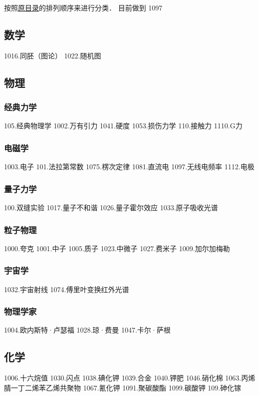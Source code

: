 
\begin{issues}
\issueDraft
\end{issues}

按照\href{https://wuli.wiki/assets/sogou}{原目录}的排列顺序来进行分类． 目前做到 1097

\subsection{数学}

1016.同胚（图论）
1022.随机图

\subsection{物理}
\subsubsection{经典力学}
105.经典物理学
1002.万有引力
1041.硬度
1053.损伤力学
110.接触力
1110.G力
\subsubsection{电磁学}
1003.电子
101.法拉第常数
1075.楞次定律
1081.直流电
1097.无线电频率
1112.电极
\subsubsection{量子力学}
100.双缝实验
1017.量子不和谐
1026.量子霍尔效应
1033.原子吸收光谱
\subsubsection{粒子物理}
1000.夸克
1001.中子
1005.质子
1023.中微子
1027.费米子
1009.加尔加梅勒
\subsubsection{宇宙学}
1032.宇宙射线
1074.傅里叶变换红外光谱
\subsubsection{物理学家}
1004.欧内斯特·卢瑟福
1028.琼·费曼
1047.卡尔·萨根

\subsection{化学}
1006.十六烷值
1030.闪点
1038.碘化钾
1039.合金
1040.钾肥
1046.硝化棉
1063.丙烯腈一丁二烯苯乙烯共聚物
1067.氰化钾
1091.聚碳酸酯
1099.碳酸钾
109.砷化镓

